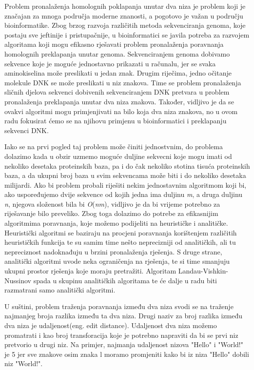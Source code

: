 Problem pronalaženja homolognih poklapanja unutar dva niza je problem koji je značajan za mnoga područja moderne znanosti, a pogotovo je važan u području bioinformatike. Zbog brzog razvoja različitih metoda sekvenciranja genoma, koje postaju sve jeftinije i pristupačnije, u bioinformatici se javila potreba za razvojem algoritama koji mogu efikasno rješavati problem pronalaženja poravnanja homolognih preklapanja unutar genoma. Sekvenciranjem genoma dobivamo sekvence koje je moguće jednostavno prikazati u računalu, jer se svaka aminokiselina može preslikati u jedan znak. Drugim riječima, jedno očitanje molekule DNK se može preslikati u niz znakova. Time se problem pronalaženja sličnih djelova sekvenci dobivenih sekvenciranjem DNK pretvara u problem pronalaženja preklapanja unutar dva niza znakova. Također, vidljivo je da se ovakvi algoritmi mogu primjenjivati na bilo koja dva niza znakova, no u ovom radu fokusirat ćemo se na njihovu primjenu u bioinformatici i preklapanju sekvenci DNK.

Iako se na prvi pogled taj problem može činiti jednostvnim, do problema dolazimo kada u obzir uzmemo moguće duljine sekvecni koje mogu imati od nekoliko desetaka proteinskih baza, pa i do čak nekoliko stotina tisuća proteinskih baza, a da ukupni broj baza u svim sekvencama može biti i do nekoliko desetaka milijardi. Ako bi problem probali riješiti nekim jednostavnim algoritmom koji bi, ako uspoređujemo dvije sekvence od kojih jedna ima duljinu \textit{m}, a druga duljinu \textit{n}, njegova složenost bila bi \textit{O}(\textit{nm}), vidljivo je da bi vrijeme potrebno za riješavanje bilo preveliko. Zbog toga dolazimo do potrebe za efikasnijim algoritmima poravnanja, koje možemo podijeliti na heurističke i analitičke. Heuristički algoritmi se baziraju na procjeni poravnanja korištenjem različitih heurističkih funkcija te su samim time nešto neprecizniji od analitičkih, ali tu nepreciznost nadoknađuju u brzini pronalaženja rješenja. S druge strane, analitički algoritmi uvode neka ograničenja na rješenja, te si time smanjuju ukupni prostor rješenja koje moraju pretražiti. Algoritam Landau-Vishkin-Nussinov spada u skupinu analitičkih algoritama te će dalje u radu biti razmatrani samo analitički algoritmi. 

U suštini, problem traženja poravnanja između dva niza svodi se na traženje najmanjeg broja razlika između ta dva niza. Drugi naziv za broj razlika između dva niza je udaljenost(eng. edit distance). Udaljenost dva niza možemo promatrati i kao broj transforacija koje je potrebno napraviti da bi se prvi niz pretvorio u drugi niz. Na primjer, najmanja udaljenost nizova "Hello" i "World!" je 5 jer sve znakove osim znaka l moramo promjeniti kako bi iz niza "Hello" dobili niz "World!". 